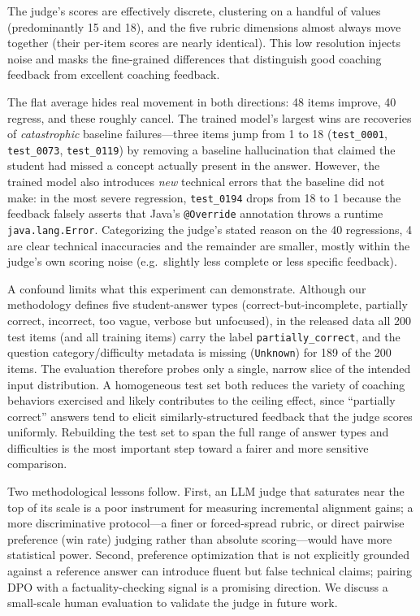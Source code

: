  The judge's scores are effectively discrete,
clustering on a handful of values (predominantly 15 and 18), and the five
rubric dimensions almost always move together (their per-item scores are nearly
identical). This low resolution injects noise and masks the fine-grained
differences that distinguish good coaching feedback from excellent coaching
feedback.

 The flat average hides real movement
in both directions: 48 items improve, 40 regress, and these roughly cancel. The
trained model's largest wins are recoveries of \emph{catastrophic} baseline
failures---three items jump from 1 to 18 (\texttt{test\_0001},
\texttt{test\_0073}, \texttt{test\_0119}) by removing a baseline hallucination
that claimed the student had missed a concept actually present in the answer.
However, the trained model also introduces \emph{new} technical errors that the
baseline did not make: in the most severe regression, \texttt{test\_0194} drops
from 18 to 1 because the feedback falsely asserts that Java's
\texttt{@Override} annotation throws a runtime \texttt{java.lang.Error}.
Categorizing the judge's stated reason on the 40 regressions, 4 are clear
technical inaccuracies and the remainder are smaller, mostly within the judge's
own scoring noise (e.g.\ slightly less complete or less specific feedback).

 A confound limits what this experiment can
demonstrate. Although our methodology defines five student-answer types
(correct-but-incomplete, partially correct, incorrect, too vague, verbose but
unfocused), in the released data all 200 test items (and all training items)
carry the label \texttt{partially\_correct}, and the question
category/difficulty metadata is missing (\texttt{Unknown}) for 189 of the 200
items. The evaluation therefore probes only a single, narrow slice of the
intended input distribution. A homogeneous test set both reduces the variety of
coaching behaviors exercised and likely contributes to the ceiling effect, since
``partially correct'' answers tend to elicit similarly-structured feedback that
the judge scores uniformly. Rebuilding the test set to span the full range of
answer types and difficulties is the most important step toward a fairer and
more sensitive comparison.

 Two methodological lessons follow. First, an LLM judge that
saturates near the top of its scale is a poor instrument for measuring
incremental alignment gains; a more discriminative protocol---a finer or
forced-spread rubric, or direct pairwise preference (win rate) judging rather
than absolute scoring---would have more statistical power. Second, preference
optimization that is not explicitly grounded against a reference answer can
introduce fluent but false technical claims; pairing DPO with a
factuality-checking signal is a promising direction. We discuss a small-scale
human evaluation to validate the judge in future work.
